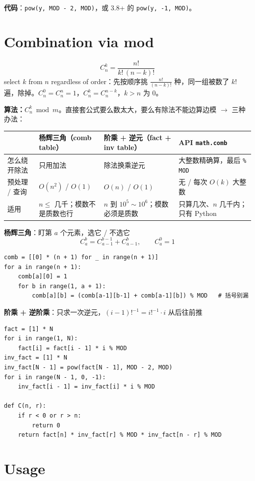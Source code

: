 \documentclass[10pt]{article}
\newcommand{\code}[1]{\texttt{\textcolor{codefg}{#1}}}
\begin{document}
\textbf{代码}：\code{pow(y, MOD - 2, MOD)}，或 3.8+ 的 \code{pow(y, -1, MOD)}。

\section{Combination via mod}

\[
C_n^k = \frac{n!}{k!\,(n-k)!}
\]
select $k$ from $n$ regardless of order：先按顺序挑 $\frac{n!}{(n-k)!}$ 种，同一组被数了 $k!$ 遍，除掉。$C_n^0 = C_n^n = 1$，$C_n^k = C_n^{n-k}$，$k > n$ 为 0。

\textbf{算法：$C_n^k \bmod m$}。直接套公式要么数太大，要么有除法不能边算边模 $\to$ 三种办法：

\begin{tabularx}{\linewidth}{@{}l X X X@{}}
\toprule
& \textbf{杨辉三角}（comb table） & \textbf{阶乘 + 逆元}（fact + inv table） & \textbf{API} \code{math.comb}\\
\midrule
怎么绕开除法 & 只用加法 & 除法换乘逆元 & 大整数精确算，最后 \code{\% MOD}\\
预处理 / 查询 & $O(n^2)$ / $O(1)$ & $O(n)$ / $O(1)$ & 无 / 每次 $O(k)$ 大整数\\
适用 & $n \le$ 几千；模数不是质数也行 & $n$ 到 $10^5 \sim 10^6$；模数必须是质数 & 只算几次、$n$ 几千内；只有 Python\\
\bottomrule
\end{tabularx}

\textbf{杨辉三角}：盯第 $a$ 个元素，选它 / 不选它
\[
C_a^b = C_{a-1}^{b-1} + C_{a-1}^{b},\qquad C_a^0 = 1
\]
\begin{lstlisting}
comb = [[0] * (n + 1) for _ in range(n + 1)]
for a in range(n + 1):
    comb[a][0] = 1
    for b in range(1, a + 1):
        comb[a][b] = (comb[a-1][b-1] + comb[a-1][b]) % MOD   # 括号别漏
\end{lstlisting}

\textbf{阶乘 + 逆阶乘}：只求一次逆元，$(i-1)!^{-1} = i!^{-1} \cdot i$ 从后往前推
\begin{lstlisting}
fact = [1] * N
for i in range(1, N):
    fact[i] = fact[i - 1] * i % MOD
inv_fact = [1] * N
inv_fact[N - 1] = pow(fact[N - 1], MOD - 2, MOD)
for i in range(N - 1, 0, -1):
    inv_fact[i - 1] = inv_fact[i] * i % MOD

def C(n, r):
    if r < 0 or r > n:
        return 0
    return fact[n] * inv_fact[r] % MOD * inv_fact[n - r] % MOD
\end{lstlisting}

\section{Usage}
\end{document}
